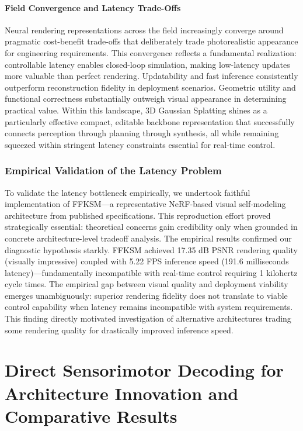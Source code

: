 ﻿\documentclass[11pt,a4paper]{article}
\begin{document}
\paragraph{Field Convergence and Latency Trade-Offs}
Neural rendering representations across the field increasingly converge around pragmatic cost-benefit trade-offs that deliberately trade photorealistic appearance for engineering requirements. This convergence reflects a fundamental realization: controllable latency enables closed-loop simulation, making low-latency updates more valuable than perfect rendering. Updatability and fast inference consistently outperform reconstruction fidelity in deployment scenarios. Geometric utility and functional correctness substantially outweigh visual appearance in determining practical value. Within this landscape, 3D Gaussian Splatting shines as a particularly effective compact, editable backbone representation that successfully connects perception through planning through synthesis, all while remaining squeezed within stringent latency constraints essential for real-time control.

\subsubsection{Empirical Validation of the Latency Problem}
To validate the latency bottleneck empirically, we undertook faithful implementation of FFKSM—a representative NeRF-based visual self-modeling architecture from published specifications. This reproduction effort proved strategically essential: theoretical concerns gain credibility only when grounded in concrete architecture-level tradeoff analysis. The empirical results confirmed our diagnostic hypothesis starkly. FFKSM achieved 17.35 dB PSNR rendering quality (visually impressive) coupled with 5.22 FPS inference speed (191.6 milliseconds latency)—fundamentally incompatible with real-time control requiring 1 kilohertz cycle times. The empirical gap between visual quality and deployment viability emerges unambiguously: superior rendering fidelity does not translate to viable control capability when latency remains incompatible with system requirements. This finding directly motivated investigation of alternative architectures trading some rendering quality for drastically improved inference speed.

\section{Direct Sensorimotor Decoding for Architecture Innovation and Comparative Results}
\end{document}
